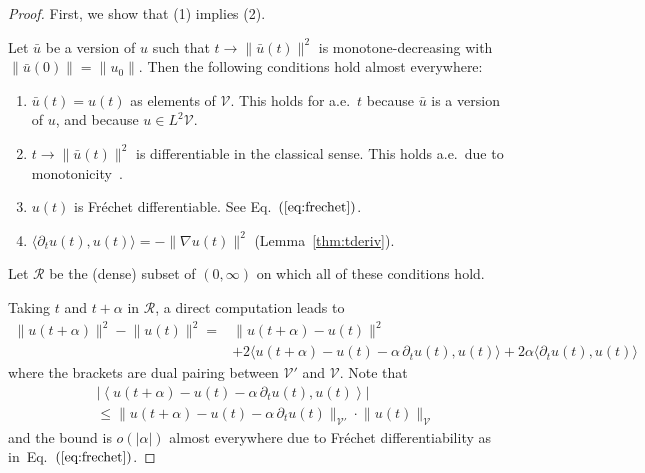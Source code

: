 \documentclass{article}
\def\eq#1{Eq.~$(\ref{#1})$}
\def\V{{\mathcal{V}}}
\def\Rcal{{\mathcal{R}}}
\begin{document}
\begin{proof}
  First, we show that (1) implies (2).

  Let $\bar u$ be a version of $u$ such that
  $t \to \lVert \bar u(t) \rVert^2$ is monotone-decreasing with $\lVert \bar u(0)\rVert = \lVert u_0\rVert$. Then the following conditions hold almost
  everywhere:
  \begin{enumerate}[label=(\roman*)]
  \item $\bar u(t) = u(t)$ as elements of $\V$. This
    holds for a.e.\ $t$ because $\bar u$ is a version of $u$, and
    because $u\in L^2 \V$.
  \item $t\rightarrow \lVert \bar u(t)\rVert^2$ is differentiable in
    the classical sense. This holds a.e.\ due to
    monotonicity~\cite[Theorem~5.2]{royden.1968}.
  \item $ u(t)$ is Fr\'echet differentiable. See \eq{eq:frechet}. 
  \item $\langle\partial_t u(t), u(t)\rangle = -  \lVert \nabla u(t)\rVert^2$ (Lemma~\ref{thm:tderiv}).
  \end{enumerate}
  Let $\Rcal$ be the (dense) subset of $(0,\infty)$ on which all of
  these conditions hold.

  Taking $t$ and $t+\alpha$ in $\Rcal$, a direct computation leads to
  \begin{equation}
  \begin{split}
    \label{eq:liminf}
    \lVert u(t+\alpha) \rVert^2-\lVert u(t) \rVert^2 = & \lVert   u(t+\alpha)-  u(t)\rVert^2 \\ &+   2 \bigl\langle  u(t+\alpha)-  u(t)-\alpha\,\partial_t u(t),  u(t) \bigr \rangle +
    2\alpha \bigl\langle \partial_t u(t),  u(t)  \bigr\rangle
  \end{split}
  \end{equation}
 where the brackets are dual pairing between $\V'$ and $\V$.
  Note that 
   \begin{equation}
    \begin{split}
   \label{approx3}
  &\left\lvert \left\langle  u(t+\alpha)-  u(t)-\alpha\,\partial_t  u(t),  u(t) \right \rangle\right\rvert \\
 &\leq \lVert   u(t+\alpha)- u(t) -\alpha\, \partial_tu(t)\rVert_{\V'}\cdot   \lVert  u(t) \rVert_{\V}
   \end{split}
\end{equation}
and the bound is $o(\lvert \alpha \rvert )$ almost everywhere due to
Fr\'echet differentiability as in~\eq{eq:frechet}.


\end{proof}
\end{document}

